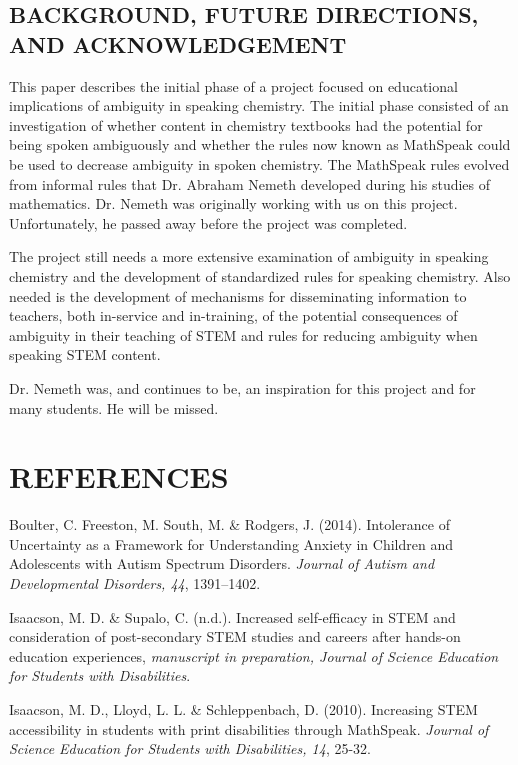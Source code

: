 \documentclass[11.5pt]{sig-alternate} %
\begin{document}
\begin{large}
\section*{BACKGROUND, FUTURE DIRECTIONS, AND ACKNOWLEDGEMENT}
 
This paper describes the initial phase of a project focused on educational implications of ambiguity in speaking chemistry. The initial phase consisted of an investigation of whether content in chemistry textbooks had the potential for being spoken ambiguously and whether the rules now known as MathSpeak could be used to decrease ambiguity in spoken chemistry. The MathSpeak rules evolved from informal rules that Dr. Abraham Nemeth developed during his studies of mathematics. Dr. Nemeth was originally working with us on this project. Unfortunately, he passed away before the project was completed. 

The project still needs a more extensive examination of ambiguity in speaking chemistry and the development of standardized rules for speaking chemistry. Also needed is the development of mechanisms for disseminating information to teachers, both in-service and in-training, of the potential consequences of ambiguity in their teaching of STEM and rules for reducing ambiguity when speaking STEM content. 

Dr. Nemeth was, and continues to be, an inspiration for this project and for many students. He will be missed.

\end{large}
\clearpage
\section*{REFERENCES}\par 

\leftskip 0.25in
\parindent -0.25in 
Boulter, C. Freeston, M. South, M. \& Rodgers, J. (2014). Intolerance of Uncertainty as a Framework for Understanding Anxiety in Children and Adolescents with Autism Spectrum Disorders.  \textit{Journal of Autism and Developmental Disorders, 44}, 1391–1402.

Isaacson, M. D. \& Supalo, C. (n.d.).  Increased self-efficacy in STEM and consideration of post-secondary STEM studies and careers after hands-on education experiences, \textit{manuscript in preparation, Journal of Science Education for Students with Disabilities}.

Isaacson, M. D., Lloyd, L. L. \& Schleppenbach, D. (2010).  Increasing STEM accessibility in students with print disabilities through MathSpeak. \textit{Journal of Science Education for Students with Disabilities, 14}, 25-32.
\end{document}
